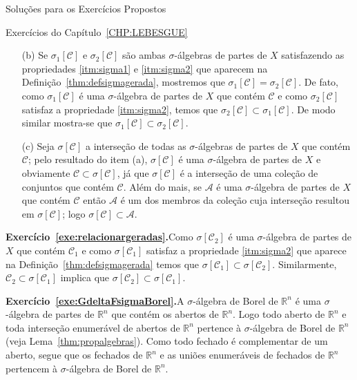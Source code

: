 \documentclass[oneside,final,11pt]{amsbook}
\newcommand{\R}{\mathds R}
\theoremstyle{remark}\newtheorem{exercise}{Exercício}[chapter]
\theoremstyle{remark}\newtheorem{*exercise}[exercise]{\hbox to 0pt{\hskip 0pt minus 1fil*}Exercício}
\theoremstyle{definition}\newtheorem{exdefin}{Definição}[chapter]
\theoremstyle{plain}\newtheorem{teo}{Teorema}[section]
\theoremstyle{plain}\newtheorem{lem}[teo]{Lema}
\theoremstyle{plain}\newtheorem{prop}[teo]{Proposição}
\theoremstyle{plain}\newtheorem{cor}[teo]{Corolário}
\theoremstyle{definition}\newtheorem{defin}[teo]{Definição}
\theoremstyle{remark}\newtheorem{rem}[teo]{Observação}
\theoremstyle{definition}\newtheorem{notation}[teo]{Notação}
\theoremstyle{definition}\newtheorem{convention}[teo]{Convenção}
\theoremstyle{definition}\newtheorem{example}[teo]{Exemplo}
\numberwithin{section}{chapter}
\numberwithin{equation}{section}
\begin{document}
\begin{chapter}{Soluções para os Exercícios Propostos}
\begin{section}{Exercícios do Capítulo~\ref{CHP:LEBESGUE}}
\begin{itemize}
\smallskip

\item[(b)] Se $\sigma_1[\mathcal C]$ e $\sigma_2[\mathcal C]$ são ambas $\sigma$-álgebras de
partes de $X$ satisfazendo as propriedades \eqref{itm:sigma1} e \eqref{itm:sigma2} que
aparecem na Definição~\ref{thm:defsigmagerada}, mostremos que $\sigma_1[\mathcal C]=\sigma_2[\mathcal C]$.
De fato, como $\sigma_1[\mathcal C]$ é uma $\sigma$-álgebra de partes de $X$ que contém $\mathcal C$
e como $\sigma_2[\mathcal C]$ satisfaz a propriedade \eqref{itm:sigma2}, temos que
$\sigma_2[\mathcal C]\subset\sigma_1[\mathcal C]$. De modo similar mostra-se que
$\sigma_1[\mathcal C]\subset\sigma_2[\mathcal C]$.

\smallskip

\item[(c)] Seja $\sigma[\mathcal C]$ a interseção de todas as $\sigma$-álgebras de partes
de $X$ que contém $\mathcal C$; pelo resultado do item (a), $\sigma[\mathcal C]$ é uma $\sigma$-álgebra
de partes de $X$ e obviamente $\mathcal C\subset\sigma[\mathcal C]$, já que $\sigma[\mathcal C]$
é a interseção de uma coleção de conjuntos que contém $\mathcal C$. Além do mais, se $\mathcal A$
é uma $\sigma$-álgebra de partes de $X$ que contém $\mathcal C$ então $\mathcal A$ é um dos membros
da coleção cuja interseção resultou em $\sigma[\mathcal C]$; logo $\sigma[\mathcal C]\subset\mathcal A$.
\end{itemize}

\medskip

\textbf{Exercício~\ref{exe:relacionargeradas}.}\enspace Como $\sigma[\mathcal C_2]$
é uma $\sigma$-álgebra de partes de $X$ que contém $\mathcal C_1$ e como $\sigma[\mathcal C_1]$
satisfaz a propriedade \eqref{itm:sigma2} que aparece na Definição~\ref{thm:defsigmagerada}
temos que $\sigma[\mathcal C_1]\subset\sigma[\mathcal C_2]$. Similarmente,
$\mathcal C_2\subset\sigma[\mathcal C_1]$ implica que $\sigma[\mathcal C_2]\subset\sigma[\mathcal C_1]$.

\medskip

\textbf{Exercício~\ref{exe:GdeltaFsigmaBorel}.}\enspace A $\sigma$-álgebra de Borel de $\R^n$
é uma $\sigma$-álgebra de partes de $\R^n$ que contém os abertos de $\R^n$. Logo todo aberto de $\R^n$ e
toda interseção enumerável de abertos de $\R^n$ pertence à $\sigma$-álgebra de Borel de $\R^n$
(veja Lema~\ref{thm:propalgebras}). Como todo fechado é complementar de um aberto, segue que
os fechados de $\R^n$ e as uniões enumeráveis de fechados de $\R^n$ pertencem à $\sigma$-álgebra
de Borel de $\R^n$.


\end{section}
\end{chapter}
\end{document}

